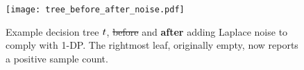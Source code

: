 \begin{figure}[htb]
  \centering
    \centering
    \texttt{[image: tree\_before\_after\_noise.pdf]}
    \caption{Example decision tree $t$, {\color{red}\st{before}} and {\color{blue}\textbf{after}} adding Laplace noise to comply with 1-DP. The rightmost leaf, originally empty, now reports a positive sample count.}
    \label{fig:comparaison}
\end{figure}